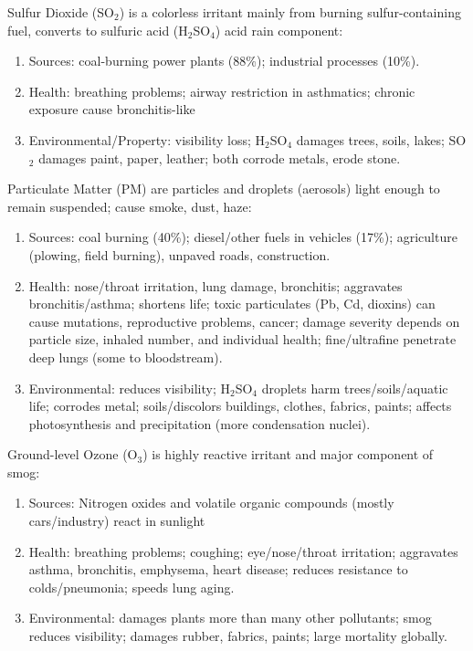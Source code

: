 \documentclass[12pt, a4paper]{article}
\begin{document}
\begin{multicols*}{3}
Sulfur Dioxide (SO$_2$) is a colorless irritant mainly from burning sulfur-containing fuel, converts to sulfuric acid (H$_2$SO$_4$) acid rain component:
\begin{enumerate}[\roman*.]
  \item Sources: coal-burning power plants (88\%); industrial processes (10\%).
  \item Health: breathing problems; airway restriction in asthmatics; chronic exposure cause bronchitis-like
  \item Environmental/Property: visibility loss; H$_2$SO$_4$ damages trees, soils, lakes; SO$_2$ damages paint, paper, leather; both corrode metals, erode stone.
\end{enumerate}
\colbreak
Particulate Matter (PM) are particles and droplets (aerosols) light enough to remain suspended; cause smoke, dust, haze:
\begin{enumerate}[\roman*.]
  \item Sources: coal burning (40\%); diesel/other fuels in vehicles (17\%); agriculture (plowing, field burning), unpaved roads, construction.
  \item Health: nose/throat irritation, lung damage, bronchitis; aggravates bronchitis/asthma; shortens life; toxic particulates (Pb, Cd, dioxins) can cause mutations, reproductive problems, cancer; damage severity depends on particle size, inhaled number, and individual health; fine/ultrafine penetrate deep lungs (some to bloodstream).
  \item Environmental: reduces visibility; H$_2$SO$_4$ droplets harm trees/soils/aquatic life; corrodes metal; soils/discolors buildings, clothes, fabrics, paints; affects photosynthesis and precipitation (more condensation nuclei).
\end{enumerate}

Ground-level Ozone (O$_3$) is highly reactive irritant and major component of smog:
\begin{enumerate}[\roman*.]
  \item Sources: Nitrogen oxides and volatile organic compounds (mostly cars/industry) react in sunlight
  \item Health: breathing problems; coughing; eye/nose/throat irritation; aggravates asthma, bronchitis, emphysema, heart disease; reduces resistance to colds/pneumonia; speeds lung aging.
  \item Environmental: damages plants more than many other pollutants; smog reduces visibility; damages rubber, fabrics, paints; large mortality globally.
\end{enumerate}


\end{multicols*}
\end{document}
